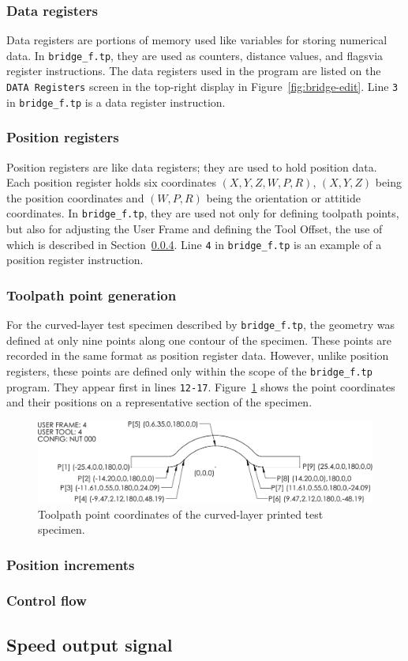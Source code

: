\subsubsection{Data registers}
Data registers are portions of memory used like variables for storing numerical data\cite[sec~7.3]{lr-handling-tool}. In \verb|bridge_f.tp|, they are used as counters, distance values, and flagsvia register instructions\cite[sec~4.5.1]{lr-handling-tool}. The data registers used in the program are listed on the \verb|DATA Registers| screen in the top-right display in Figure~\ref{fig:bridge-edit}. Line \verb|3| in \verb|bridge_f.tp| is a data register instruction.

\subsubsection{Position registers}
Position registers are like data registers; they are used to hold position data\cite[sec~7.4]{lr-handling-tool}. Each position register holds six coordinates \((X,Y,Z,W,P,R)\), \((X,Y,Z)\) being the position coordinates and \((W,P,R)\) being the orientation or attitide coordinates.  In \verb|bridge_f.tp|, they are used not only for defining toolpath points, but also for adjusting the User Frame and defining the Tool Offset, the use of which is described in Section~\ref{sec:pos-incr}. Line \verb|4| in \verb|bridge_f.tp| is an example of a position register instruction.

\subsubsection{Toolpath point generation}
\label{sec:point-gen}
For the curved-layer test specimen described by \verb|bridge_f.tp|, the geometry was defined at only nine points along one contour of the specimen. These points are recorded in the same format as position register data. However, unlike position registers, these points are defined only within the scope of the \verb|bridge_f.tp| program. They appear first in lines \verb|12-17|. Figure~\ref{fig:toolpath-coords} shows the point coordinates and their positions on a representative section of the specimen. 

\begin{figure}
    \centering
    \includegraphics[width=.9\linewidth]{figures/toolpath-coords}
    \caption{Toolpath point coordinates of the curved-layer printed test specimen.}
    \label{fig:toolpath-coords}
\end{figure}

\subsubsection{Position increments}
\label{sec:pos-incr}
\subsubsection{Control flow}

\subsection{Speed output signal}

